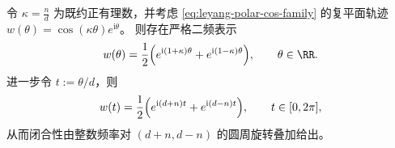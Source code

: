 \begin{remark}\label{rem:leyang-polar-complex-lissajous}
令 \(\kappa=\frac{n}{d}\) 为既约正有理数，并考虑 \eqref{eq:leyang-polar-cos-family} 的复平面轨迹 \(w(\theta)=\cos(\kappa\theta)e^{\mathrm{i}\theta}\)。
则存在严格二频表示
\[
w(\theta)=\frac12\Bigl(e^{\mathrm{i}(1+\kappa)\theta}+e^{\mathrm{i}(1-\kappa)\theta}\Bigr),
\qquad \theta\in\RR.
\]
进一步令 \(t:=\theta/d\)，则
\[
w(t)=\frac12\Bigl(e^{\mathrm{i}(d+n)t}+e^{\mathrm{i}(d-n)t}\Bigr),
\qquad t\in[0,2\pi],
\]
从而闭合性由整数频率对 \((d+n,d-n)\) 的圆周旋转叠加给出。
\end{remark}

\endinput
